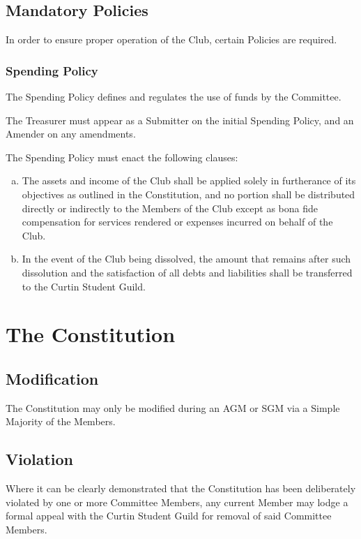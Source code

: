 \documentclass[a4paper,12pt]{article}
\begin{document}
\subsection{Mandatory Policies}

In order to ensure proper operation of the Club, certain Policies are required.

\subsubsection{Spending Policy}

The Spending Policy defines and regulates the use of funds by the Committee.

The Treasurer must appear as a Submitter on the initial Spending Policy, and an Amender on any amendments.

The Spending Policy must enact the following clauses:
\begin{enumerate}[a)]
	\item The assets and income of the Club shall be applied solely in furtherance of its objectives as outlined in the Constitution, and no portion shall be distributed directly or indirectly to the Members of the Club except as bona fide compensation for services rendered or expenses incurred on behalf of the Club.
	\item In the event of the Club being dissolved, the amount that remains after such dissolution and the satisfaction of all debts and liabilities shall be transferred to the Curtin Student Guild.
\end{enumerate}

\section{The Constitution}

\subsection{Modification}

The Constitution may only be modified during an AGM or SGM via a Simple Majority of the Members.

\subsection{Violation}

Where it can be clearly demonstrated that the Constitution has been deliberately violated by one or more Committee Members, any current Member may lodge a formal appeal with the Curtin Student Guild for removal of said Committee Members.
\end{document}
